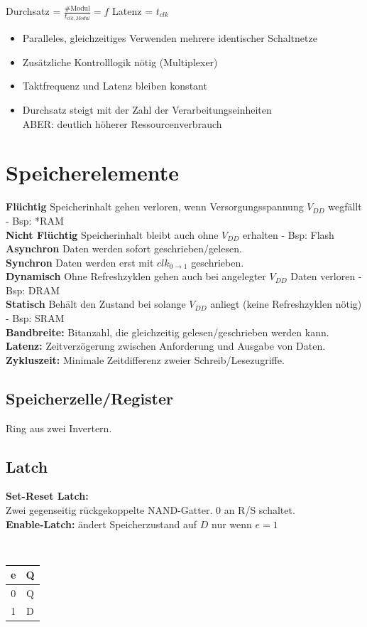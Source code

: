 \documentclass[6pt,a4paper]{scrartcl}
\renewcommand{\emph}[1]{\textsf{\textbf{#1}}}
\newcommand{\ra}[0]{\ensuremath{\rightarrow}} 									%
\begin{document}
\begin{multicols*}{3}
	Durchsatz = $\frac{\#\text{Modul}}{t_{clk,Modul}} = f$ \qquad \quad Latenz = $t_{clk}$
	\begin{itemize} \itemsep0pt
		\item Paralleles, gleichzeitiges Verwenden mehrere identischer Schaltnetze
		\item Zusätzliche Kontrolllogik nötig (Multiplexer)
		\item Taktfrequenz und Latenz bleiben konstant
		\item Durchsatz steigt mit der Zahl der Verarbeitungseinheiten \\
		ABER: deutlich höherer Ressourcenverbrauch
	\end{itemize}


\section{Speicherelemente}
	\emph{Flüchtig} Speicherinhalt gehen verloren, wenn Versorgungsspannung $V_{DD}$ wegfällt - Bsp: *RAM\\
	\emph{Nicht Flüchtig} Speicherinhalt bleibt auch ohne $V_{DD}$ erhalten - Bsp: Flash\\
	\emph{Asynchron} Daten werden sofort geschrieben/gelesen.\\
	\emph{Synchron} Daten werden erst mit $clk_{0 \ra 1}$ geschrieben.\\
	\emph{Dynamisch} Ohne Refreshzyklen gehen auch bei angelegter $V_{DD}$ Daten verloren -  Bsp: DRAM\\
	\emph{Statisch} Behält den Zustand bei solange $V_{DD}$ anliegt (keine Refreshzyklen nötig) - Bsp: SRAM\\
	\emph{Bandbreite:} Bitanzahl, die gleichzeitig gelesen/geschrieben werden kann.
	\emph{Latenz:} Zeitverzögerung zwischen Anforderung und Ausgabe von Daten.
	\emph{Zykluszeit:} Minimale Zeitdifferenz zweier Schreib/Lesezugriffe.
	

	\subsection{Speicherzelle/Register}
	Ring aus zwei Invertern.
	
	\subsection{Latch}
	\parbox{5cm}{
		\emph{Set-Reset Latch:} \\ Zwei gegenseitig rückgekoppelte NAND-Gatter. $0$ an R/S schaltet.
		\\	\emph{Enable-Latch:} ändert Speicherzustand auf $D$ nur wenn $e=1$
	}
	\parbox{.5cm}{\ }
	\parbox{2cm}{
		\begin{tabular}{c|c} e & Q \\ \hline 0 & Q \\ 1 & D \end{tabular}
	}
	


\end{multicols*}
\end{document}
